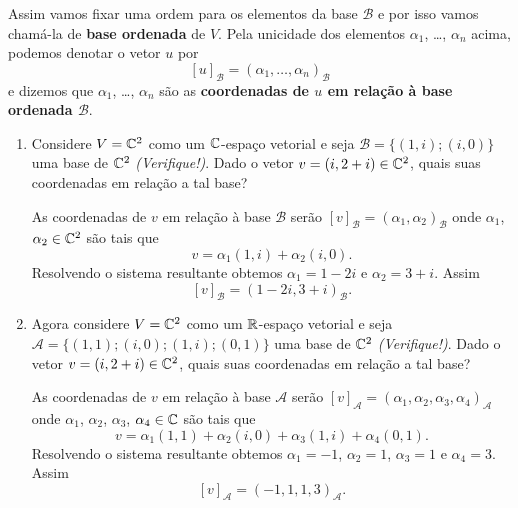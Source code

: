 Assim vamos fixar uma ordem para os elementos da base $\mathcal{B}$ e por isso vamos cham\'a-la de \textbf{base ordenada} de $V$. Pela unicidade dos elementos $\alpha_1$, \dots, $\alpha_n$ acima, podemos denotar o vetor $u$ por
\[
	[u]_\mathcal{B} = (\alpha_1,\dots,\alpha_n)_\mathcal{B}
\]
e dizemos que $\alpha_1$, \dots, $\alpha_n$ s\~ao as \textbf{coordenadas de $u$ em rela\c{c}\~ao \`a base ordenada $\mathcal{B}$}.

\begin{exemplos}
	\begin{enumerate}
		\item Considere $V = \mathbb{C}^2$ como um $\mathbb{C}$-espa\c{c}o vetorial e seja $\mathcal{B} = \{(1,i);(i,0)\}$ uma base de $\mathbb{C}^2$ \textit{(Verifique!)}. Dado o vetor $v = (i, 2+i) \in \mathbb{C}^2$, quais suas coordenadas em rela\c{c}\~ao a tal base?
		\begin{solucao}
			As coordenadas de $v$ em rela\c{c}\~ao \`a base $\mathcal{B}$ ser\~ao $[v]_\mathcal{B} = (\alpha_1,\alpha_2)_\mathcal{B}$ onde $\alpha_1$, $\alpha_2 \in \mathbb{C}^2$ s\~ao tais que
			\[
				v = \alpha_1(1,i) + \alpha_2(i,0).
			\]
			Resolvendo o sistema resultante obtemos $\alpha_1 = 1 - 2i$ e $\alpha_2 = 3 + i$. Assim
			\[
				[v]_\mathcal{B} = (1 - 2i, 3 + i)_\mathcal{B}.
			\]
		\end{solucao}

		\item Agora considere $V = \mathbb{C}^2$ como um $\mathbb{R}$-espa\c{c}o vetorial e seja $\mathcal{A} = \{(1,1);(i,0);(1,i);(0,1)\}$ uma base de $\mathbb{C}^2$ \textit{(Verifique!)}. Dado o vetor $v = (i,2+i) \in \mathbb{C}^2$, quais suas coordenadas em rela\c{c}\~ao a tal base?
		\begin{solucao}
			As coordenadas de $v$ em rela\c{c}\~ao \`a base $\mathcal{A}$ ser\~ao $[v]_\mathcal{A} = (\alpha_1,\alpha_2,\alpha_3,\alpha_4)_\mathcal{A}$ onde $\alpha_1$, $\alpha_2$, $\alpha_3$, $\alpha_4 \in \mathbb{C}$ s\~ao tais que
			\[
				v = \alpha_1(1,1) + \alpha_2(i,0) + \alpha_3(1,i) + \alpha_4(0,1).
			\]
			Resolvendo o sistema resultante obtemos $\alpha_1 = -1$, $\alpha_2 = 1$, $\alpha_3 = 1$ e $\alpha_4 = 3$. Assim
			\[
				[v]_\mathcal{A} = (-1,1,1,3)_\mathcal{A}.
			\]
		\end{solucao}
	\end{enumerate}
\end{exemplos}

